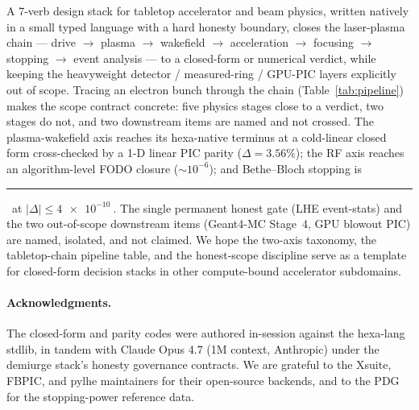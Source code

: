 \documentclass[11pt,a4paper]{article}
\newcommand{\tierdisc}[1]{\textcolor{#1}{\rule[0.05ex]{1.0ex}{1.0ex}}}
\newcommand{\tierGreen}{\tierdisc{green!60!black}}
\begin{document}
A 7-verb design stack for tabletop accelerator and beam physics, written
natively in a small typed language with a hard honesty boundary, closes
the laser-plasma chain --- drive $\to$ plasma $\to$ wakefield $\to$
acceleration $\to$ focusing $\to$ stopping $\to$ event analysis --- to a
closed-form or numerical verdict, while keeping the heavyweight
detector / measured-ring / GPU-PIC layers explicitly out of scope.
Tracing an electron bunch through the chain (Table~\ref{tab:pipeline})
makes the scope contract concrete: five physics stages close to a
verdict, two stages do not, and two downstream items are named and not
crossed. The plasma-wakefield axis reaches its hexa-native terminus at a
cold-linear closed form cross-checked by a 1-D linear PIC parity
($\Delta=3.56\%$); the RF axis reaches an algorithm-level FODO closure
($\sim\!10^{-6}$); and Bethe--Bloch stopping is \tierGreen\ at
$|\Delta|\!\le\!\SI{4e-10}{}$. The single permanent honest gate (LHE
event-stats) and the two out-of-scope downstream items (Geant4-MC
Stage~4, GPU blowout PIC) are named, isolated, and not claimed. We hope
the two-axis taxonomy, the tabletop-chain pipeline table, and the
honest-scope discipline serve as a template for closed-form decision
stacks in other compute-bound accelerator subdomains.

\paragraph{Acknowledgments.} The closed-form and parity codes were
authored in-session against the hexa-lang stdlib, in tandem with
Claude Opus 4.7 (1M context, Anthropic) under the demiurge stack's
honesty governance contracts. We are grateful to the Xsuite, FBPIC, and
pylhe maintainers for their open-source backends, and to the PDG for the
stopping-power reference data.




\clearpage
\appendix











\end{document}
